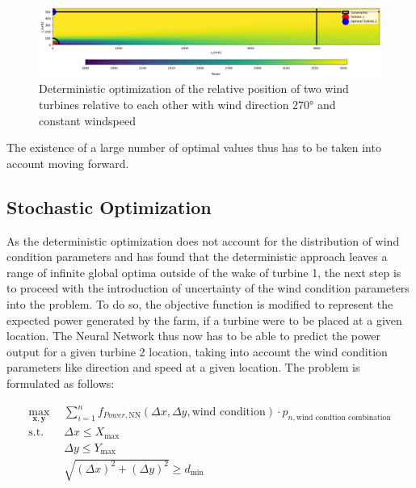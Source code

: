 \begin{figure}[h] 
	\centering
	\includegraphics[width=1\textwidth]{figures/optimization/opti_determ270.png} 
	\caption{Deterministic optimization of the relative position of two wind turbines relative to each other with wind direction 270° and constant windspeed}
	\label{fig:opti_determ270}
\end{figure}

The existence of a large number of optimal values thus has to be taken into account moving forward.

\subsection{Stochastic Optimization} \label{sec:stoch_opti_1}

As the deterministic optimization does not account for the distribution of wind condition parameters and has found that the deterministic approach leaves a range of infinite global optima outside of the wake of turbine 1, the next step is to proceed with the introduction of uncertainty of the wind condition parameters into the problem. To do so, the objective function is modified to represent the expected power generated by the farm, if a turbine were to be placed at a given location. The Neural Network thus now has to be able to predict the power output for a given turbine 2 location, taking into account the wind condition parameters like direction and speed at a given location. The problem is formulated as follows: 

\begin{align}
	\max_{\mathbf{x}, \mathbf{y}} &  \sum_{i=1}^{n} f_{Power,\text{NN}}(\Delta x, \Delta y, \text{wind condition})\cdot p_{n,\text{wind condtion combination}} \\
	\text{s.t.} \quad 
	&  \Delta x \leq X_{\max} \\
	&  \Delta y \leq Y_{\max} \\
	& \sqrt{(\Delta x)^2 + (\Delta y)^2} \geq d_{\min}
\end{align}

